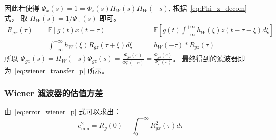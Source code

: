 \documentclass{ctexart}
\numberwithin{equation}{section}
\def\E{\mathbb{E}}
\begin{document}
因此若使得 $\Phi_x(s) = 1 = \Phi_z(s) H_W(s) H_W(-s)$, 根据~\eqref{eq:Phi_z_decom} 式， 取 $H_W(s) = 1/\Phi_z^+(s)$ 即可。
\begin{align*}
R_{gx}(\tau) & = \E[g(t)x(t-\tau)] && = \E[g(t)\int_{-\infty}^{+\infty} h_W(\xi) z(t-\tau-\xi)d\xi] \\
& = \int_{-\infty}^{+\infty} h_W(\xi) R_{gz}(\tau + \xi)d\xi && = h_W(-\tau) * R_{gz}(\tau)
\end{align*}
所以 $ \Phi_{gx}(s) = H_W(-s) \Phi_{gz}(s) = \frac{\Phi_{gz}(s)}{\Phi_z^+(-s)} = \frac{\Phi_{gz}(s)}{\Phi_z^{-}(s)}$。
最终得到的滤波器即为~\eqref{eq:wiener_transfer_p} 所示。
\subsubsection{Wiener 滤波器的估值方差}
由~\eqref{eq:error_wiener_p} 式可以求出：
\begin{equation}\label{eq:wf_error_p}
    e^2_{\min} = R_g(0) - \int_0^{+\infty} R_{gx}^2(\tau) d\tau
\end{equation}
\end{document}
